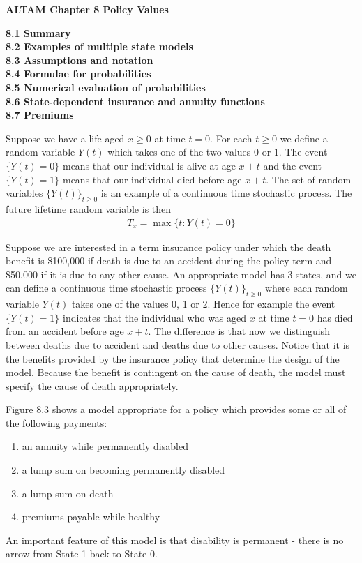 \documentclass[hidelinks, 12pt]{article}
\theoremstyle{mydefstyle}
\theoremstyle{mythmstyle}
\newcounter{prop}
\begin{document}
\textbf{ALTAM Chapter 8 Policy Values}

\textbf{8.1 Summary} \\
\textbf{8.2 Examples of multiple state models} \\
\textbf{8.3 Assumptions and notation} \\
\textbf{8.4 Formulae for probabilities} \\
\textbf{8.5 Numerical evaluation of probabilities} \\
\textbf{8.6 State-dependent insurance and annuity functions} \\
\textbf{8.7 Premiums}

Suppose we have a life aged $x \ge 0$ at time $t = 0$. For each $t \ge 0$ we define a random variable $Y(t)$ which takes one of the two values 0 or 1. The event $\{Y(t) = 0\}$ means that our individual is alive at age $x+t$ and the event $\{Y(t) = 1\}$ means that our individual died before age $x+t$. The set of random variables $\{Y(t)\}_{t \ge 0}$ is an example of a continuous time stochastic process. The future lifetime random variable is then
\begin{gather*}
T_x = \max\{t : Y(t) = 0\}
\end{gather*}

Suppose we are interested in a term insurance policy under which the death benefit is \$100,000 if death is due to an accident during the policy term and \$50,000 if it is due to any other cause. An appropriate model has 3 states, and we can define a continuous time stochastic process $\{Y(t)\}_{t \ge 0}$ where each random variable $Y(t)$ takes one of the values 0, 1 or 2. Hence for example the event $\{Y(t) = 1\}$ indicates that the individual who was aged $x$ at time $t = 0$ has died from an accident before age $x+t$. The difference is that now we distinguish between deaths due to accident and deaths due to other causes. Notice that it is the benefits provided by the insurance policy that determine the design of the model. Because the benefit is contingent on the cause of death, the model must specify the cause of death appropriately. 

Figure 8.3 shows a model appropriate for a policy which provides some or all of the following payments:
\begin{enumerate}[label=(\roman*)]
\item an annuity while permanently disabled
\item a lump sum on becoming permanently disabled
\item a lump sum on death
\item premiums payable while healthy
\end{enumerate}
An important feature of this model is that disability is permanent - there is no arrow from State 1 back to State 0. 
\end{document}
